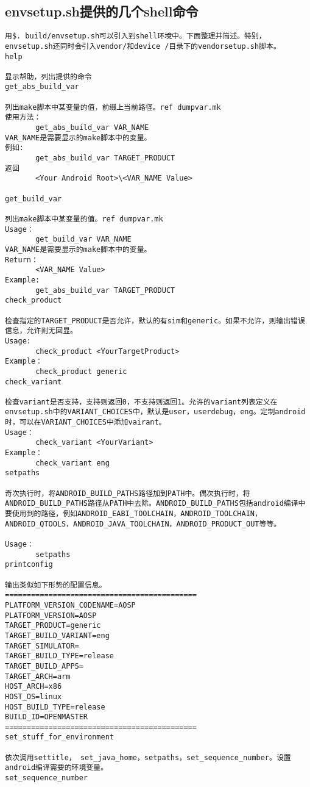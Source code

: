 \documentclass[12pt,a4paper]{article}
\begin{document}
\subsection{envsetup.sh提供的几个shell命令}
\begin{verbatim}
用$. build/envsetup.sh可以引入到shell环境中。下面整理并简述。特别，envsetup.sh还同时会引入vendor/和device /目录下的vendorsetup.sh脚本。
help   
 
显示帮助，列出提供的命令
get_abs_build_var  
 
列出make脚本中某变量的值，前缀上当前路径。ref dumpvar.mk
使用方法：
       get_abs_build_var VAR_NAME
VAR_NAME是需要显示的make脚本中的变量。
例如:
       get_abs_build_var TARGET_PRODUCT
返回
       <Your Android Root>\<VAR_NAME Value>
 
get_build_var    
 
列出make脚本中某变量的值。ref dumpvar.mk
Usage：
       get_build_var VAR_NAME
VAR_NAME是需要显示的make脚本中的变量。
Return：
       <VAR_NAME Value>
Example:
       get_abs_build_var TARGET_PRODUCT
check_product
 
检查指定的TARGET_PRODUCT是否允许，默认的有sim和generic。如果不允许，则输出错误信息，允许则无回显。
Usage:
       check_product <YourTargetProduct>
Example：
       check_product generic
check_variant
 
检查variant是否支持，支持则返回0，不支持则返回1。允许的variant列表定义在envsetup.sh中的VARIANT_CHOICES中，默认是user，userdebug，eng。定制android时，可以在VARIANT_CHOICES中添加vairant。
Usage：
       check_variant <YourVariant>
Example：
       check_variant eng
setpaths
 
奇次执行时，将ANDROID_BUILD_PATHS路径加到PATH中。偶次执行时，将ANDROID_BUILD_PATHS路径从PATH中去除。ANDROID_BUILD_PATHS包括android编译中要使用到的路径，例如ANDROID_EABI_TOOLCHAIN，ANDROID_TOOLCHAIN，ANDROID_QTOOLS，ANDROID_JAVA_TOOLCHAIN，ANDROID_PRODUCT_OUT等等。
 
Usage：
       setpaths
printconfig
 
输出类似如下形势的配置信息。
============================================
PLATFORM_VERSION_CODENAME=AOSP
PLATFORM_VERSION=AOSP
TARGET_PRODUCT=generic
TARGET_BUILD_VARIANT=eng
TARGET_SIMULATOR=
TARGET_BUILD_TYPE=release
TARGET_BUILD_APPS=
TARGET_ARCH=arm
HOST_ARCH=x86
HOST_OS=linux
HOST_BUILD_TYPE=release
BUILD_ID=OPENMASTER
============================================
set_stuff_for_environment
 
依次调用settitle， set_java_home，setpaths，set_sequence_number。设置android编译需要的环境变量。
set_sequence_number
 

\end{verbatim}
\end{document}
